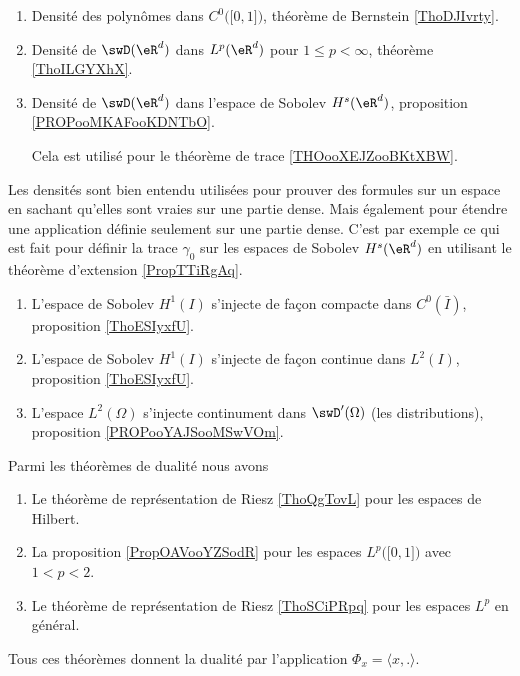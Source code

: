 \begin{enumerate}
    \item 
        Densité des polynômes dans \( C^0\big( \mathopen[ 0 , 1 \mathclose] \big)\), théorème de Bernstein \ref{ThoDJIvrty}.
    \item
        Densité de \( \swD(\eR^d)\) dans \( L^p(\eR^d)\) pour \( 1\leq p<\infty\), théorème \ref{ThoILGYXhX}.
    \item
        Densité de \( \swD(\eR^d)\) dans l'espace de Sobolev \( H^s(\eR^d)\), proposition \ref{PROPooMKAFooKDNTbO}. 

        Cela est utilisé pour le théorème de trace \ref{THOooXEJZooBKtXBW}.
\end{enumerate}
Les densités sont bien entendu utilisées pour prouver des formules sur un espace en sachant qu'elles sont vraies sur une partie dense. Mais également pour étendre une application définie seulement sur une partie dense. C'est par exemple ce qui est fait pour définir la trace \( \gamma_0\) sur les espaces de Sobolev \( H^s(\eR^d)\) en utilisant le théorème d'extension \ref{PropTTiRgAq}.

\begin{enumerate}
        \item
            L'espace de Sobolev \( H^1(I)\) s'injecte de façon compacte dans \( C^0(\bar I)\), proposition \ref{ThoESIyxfU}.
        \item
            L'espace de Sobolev \( H^1(I)\) s'injecte de façon continue dans \( L^2(I)\), proposition \ref{ThoESIyxfU}.
        \item
            L'espace \( L^2(\Omega)\) s'injecte continument dans \( \swD'(\Omega)\) (les distributions), proposition \ref{PROPooYAJSooMSwVOm}.
\end{enumerate}

Parmi les théorèmes de dualité nous avons
\begin{enumerate}
    \item
        Le théorème de représentation de Riesz \ref{ThoQgTovL} pour les espaces de Hilbert.
    \item
        La proposition \ref{PropOAVooYZSodR} pour les espaces \( L^p\big( \mathopen[ 0 , 1 \mathclose] \big)\) avec \( 1<p<2\).
    \item
        Le théorème de représentation de Riesz \ref{ThoSCiPRpq} pour les espaces \( L^p\) en général.
\end{enumerate}
Tous ces théorèmes donnent la dualité par l'application \( \Phi_x=\langle x, .\rangle \).

